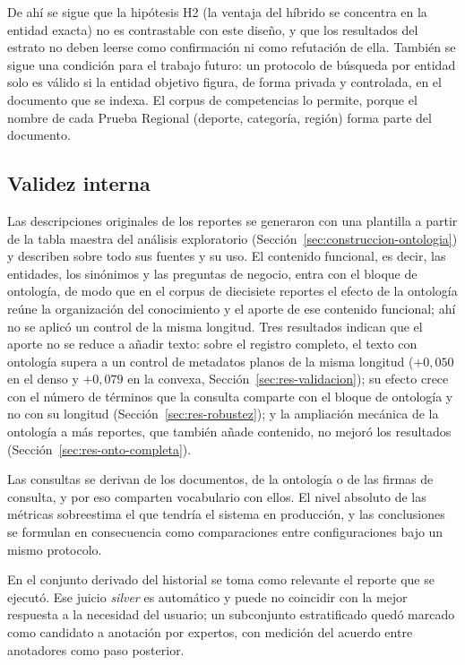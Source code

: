 \documentclass[11pt,letterpaper]{article}
\numberwithin{equation}{section}
\begin{document}
De ahí se sigue que la hipótesis H2 (la ventaja del híbrido se concentra en la entidad exacta) no es contrastable con este diseño, y que los resultados del estrato no deben leerse como confirmación ni como refutación de ella. También se sigue una condición para el trabajo futuro: un protocolo de búsqueda por entidad solo es válido si la entidad objetivo figura, de forma privada y controlada, en el documento que se indexa. El corpus de competencias lo permite, porque el nombre de cada Prueba Regional (deporte, categoría, región) forma parte del documento.

\subsection{Validez interna}
Las descripciones originales de los reportes se generaron con una plantilla a partir de la tabla maestra del análisis exploratorio (Sección~\ref{sec:construccion-ontologia}) y describen sobre todo sus fuentes y su uso. El contenido funcional, es decir, las entidades, los sinónimos y las preguntas de negocio, entra con el bloque de ontología, de modo que en el corpus de diecisiete reportes el efecto de la ontología reúne la organización del conocimiento y el aporte de ese contenido funcional; ahí no se aplicó un control de la misma longitud. Tres resultados indican que el aporte no se reduce a añadir texto: sobre el registro completo, el texto con ontología supera a un control de metadatos planos de la misma longitud ($+0{,}050$ en el denso y $+0{,}079$ en la convexa, Sección~\ref{sec:res-validacion}); su efecto crece con el número de términos que la consulta comparte con el bloque de ontología y no con su longitud (Sección~\ref{sec:res-robustez}); y la ampliación mecánica de la ontología a más reportes, que también añade contenido, no mejoró los resultados (Sección~\ref{sec:res-onto-completa}).

Las consultas se derivan de los documentos, de la ontología o de las firmas de consulta, y por eso comparten vocabulario con ellos. El nivel absoluto de las métricas sobreestima el que tendría el sistema en producción, y las conclusiones se formulan en consecuencia como comparaciones entre configuraciones bajo un mismo protocolo.

En el conjunto derivado del historial se toma como relevante el reporte que se ejecutó. Ese juicio \textit{silver} es automático y puede no coincidir con la mejor respuesta a la necesidad del usuario; un subconjunto estratificado quedó marcado como candidato a anotación por expertos, con medición del acuerdo entre anotadores como paso posterior.
\end{document}

